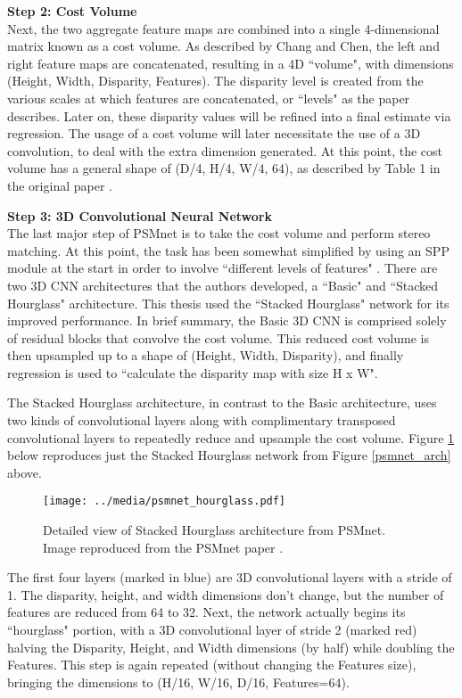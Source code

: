 \textbf{{\large Step 2: Cost Volume}} \\
Next, the two aggregate feature maps are combined into a single 4-dimensional matrix known as a cost volume. As described by Chang and Chen, the left and right feature maps are concatenated, resulting in a 4D ``volume", with dimensions (Height, Width, Disparity, Features). The disparity level is created from the various scales at which features are concatenated, or ``levels" as the paper describes. Later on, these disparity values will be refined into a final estimate via regression. The usage of a cost volume will later necessitate the use of a 3D convolution, to deal with the extra dimension generated. At this point, the cost volume has a general shape of (D/4, H/4, W/4, 64), as described by Table 1 in the original paper \cite{chang_pyramid_2018}.

\textbf{{\large Step 3: 3D Convolutional Neural Network}} \\
The last major step of PSMnet is to take the cost volume and perform stereo matching. At this point, the task has been somewhat simplified by using an SPP module at the start in order to involve ``different levels of features" \cite{chang_pyramid_2018}. There are two 3D CNN architectures that the authors developed, a ``Basic" and ``Stacked Hourglass" architecture. This thesis used the ``Stacked Hourglass" network for its improved performance. In brief summary, the Basic 3D CNN is comprised solely of residual blocks that convolve the cost volume. This reduced cost volume is then upsampled up to a shape of (Height, Width, Disparity), and finally regression is used to ``calculate the disparity map with size H x W".

The Stacked Hourglass architecture, in contrast to the Basic architecture, uses two kinds of convolutional layers along with complimentary transposed convolutional layers to repeatedly reduce and upsample the cost volume. Figure \ref{psmnet_hourglass} below reproduces just the Stacked Hourglass network from Figure \ref{psmnet_arch} above. 


\begin{figure}[ht]
	\texttt{[image: ../media/psmnet\_hourglass.pdf]}
	\caption{Detailed view of Stacked Hourglass architecture from PSMnet. Image reproduced from the PSMnet paper \cite{chang_pyramid_2018}.}
	\label{psmnet_hourglass}
\end{figure}

The first four layers (marked in blue) are 3D convolutional layers with a stride of 1. The disparity, height, and width dimensions don't change, but the number of features are reduced from 64 to 32. Next, the network actually begins its ``hourglass" portion, with a 3D convolutional layer of stride 2 (marked red) halving the Disparity, Height, and Width dimensions (by half) while doubling the Features. This step is again repeated (without changing the Features size), bringing the dimensions to (H/16, W/16, D/16, Features=64). 

